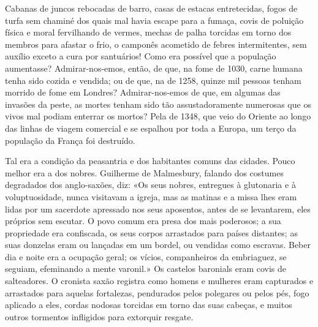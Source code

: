 \documentclass[11pt,a5paper,twoside,openany]{book}
\begin{document}
Cabanas de juncos rebocadas de barro, casas de estacas entretecidas, fogos de turfa sem chaminé dos quais mal havia escape para a fumaça, covis de poluição física e moral fervilhando de vermes, mechas de palha torcidas em torno dos membros para afastar o frio, o camponês acometido de febres intermitentes, sem auxílio exceto a cura por santuários! Como era possível que a população aumentasse? Admirar-nos-emos, então, de que, na fome de 1030, carne humana tenha sido cozida e vendida; ou de que, na de 1258, quinze mil pessoas tenham morrido de fome em Londres? Admirar-nos-emos de que, em algumas das invasões da peste, as mortes tenham sido tão assustadoramente numerosas que os vivos mal podiam enterrar os mortos? Pela de 1348, que veio do Oriente ao longo das linhas de viagem comercial e se espalhou por toda a Europa, um terço da população da França foi destruído.

Tal era a condição da peasantria e dos habitantes comuns das cidades. Pouco melhor era a dos nobres. Guilherme de Malmesbury, falando dos costumes degradados dos anglo-saxões, diz: «Os seus nobres, entregues à glutonaria e à voluptuosidade, nunca visitavam a igreja, mas as matinas e a missa lhes eram lidas por um sacerdote apressado nos seus aposentos, antes de se levantarem, eles próprios sem escutar. O povo comum era presa dos mais poderosos; a sua propriedade era confiscada, os seus corpos arrastados para países distantes; as suas donzelas eram ou lançadas em um bordel, ou vendidas como escravas. Beber dia e noite era a ocupação geral; os vícios, companheiros da embriaguez, se seguiam, efeminando a mente varonil.» Os castelos baronials eram covis de salteadores. O cronista saxão registra como homens e mulheres eram capturados e arrastados para aquelas fortalezas, pendurados pelos polegares ou pelos pés, fogo aplicado a eles, cordas nodosas torcidas em torno das suas cabeças, e muitos outros tormentos infligidos para extorquir resgate.
\end{document}
